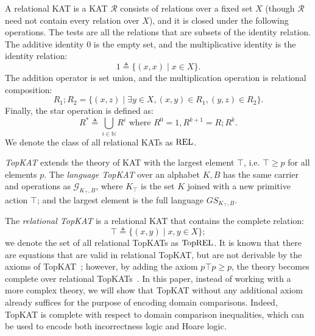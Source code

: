 \begin{definition}
  A relational KAT is a KAT $\mathcal{R}$ consists of relations over a fixed set \(X\) 
  (though $\mathcal{R}$ need not contain every relation over $X$),
  and it is closed under the following operations. 
  The tests are all the relations that are subsets of the identity relation.  
  The additive identity 0 is the empty set, and
  the multiplicative identity is the identity relation:
  \[1  \triangleq  \{(x, x)  \mid  x  \in  X\}.\] The addition operator is set union, and the
  multiplication operation is relational composition:
  \[R_{1} ; R_{2} = \{(x, z)  \mid   \exists  y  \in  X, (x, y)  \in  R_{1}, (y, z)  \in  R_{2}\}.\] 
  Finally, the star operation is defined as:
  \[R^*  \triangleq   \bigcup _{i  \in  \mathbb{N}} R^i \text{ where } R^0 = 1, R^{k+1} = R ; R^k.\] We denote the
  class of all relational KATs as \(\mathbf{\mathrm{REL}}\).
\end{definition}

\emph{TopKAT} extends the theory of KAT with the largest element \( \top \), i.e.
\( \top   \geq  p\) for all elements \(p\).  The \emph{language TopKAT} over an alphabet
\(K, B\) has the same carrier and operations as \(\mathcal{G}_{K_ \top , B}\), where \(K_ \top \) is
the set \(K\) joined with a new primitive action \( \top \); and the largest element
is the full language \(GS_{K_ \top , B}\).

The \emph{relational TopKAT} is a relational KAT that contains the complete relation:
\[ \top   \triangleq  \{(x, y)  \mid  x, y  \in  X\};\] we denote the set of all relational TopKATs as
\(\mathbf{\mathrm{TopREL}}\).  It is known that there are equations that are valid in relational
TopKAT, but are not derivable by the axioms of
TopKAT~\cite{Zhang_de_Amorim_Gaboardi_2022}; however, by adding the axiom
\(p  \top  p  \geq  p\), the theory becomes complete over relational
TopKATs~\cite{Pous_Wagemaker_2022,Pous_Wagemaker_2023}.  
In this paper, instead of working with a more complex theory, 
we will show that TopKAT without any additional axiom already suffices 
for the purpose of encoding domain comparisons. 
Indeed, TopKAT is complete with respect to domain comparison inequalities,
which can be used to encode both incorrectness logic and Hoare logic.

